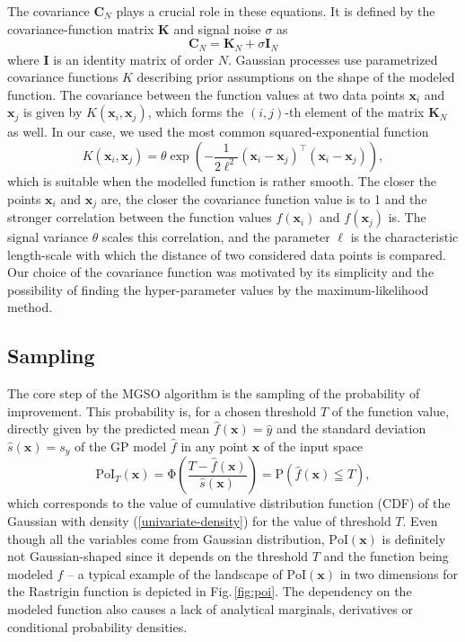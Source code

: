 \documentclass{itatnew}
\newcommand{\xx}{\mathrm{\mathbf{x}}}
\newcommand{\CC}{\mathrm{\mathbf{C}}}
\begin{document}
The covariance $\CC_N$ plays a crucial role in these equations. It is defined by the covariance-function matrix $\mathbf{K}$ and signal noise $\sigma$ as
\begin{equation}
  \CC_N = \mathbf{K}_N + \sigma \mathbf{I}_N
\end{equation}
where $\mathbf{I}$ is an identity matrix of order $N$. Gaussian processes use parametrized covariance functions $K$ describing prior assumptions on the shape of the modeled function. The covariance between the function values at two data points $\xx_i$ and $\xx_j$ is given by $K(\xx_i, \xx_j)$, which forms the $(i,j)$-th element of the matrix $\mathbf{K}_N$ as well. In our case, we used the most common squared-exponential function
\begin{equation}
K(\xx_i, \xx_j) = \theta \exp \left( -\frac{1}{2\ell^2} (\xx_i - \xx_j)^\top(\xx_i - \xx_j) \right), %
\end{equation}
which is suitable when the modelled function is rather smooth. The closer the points $\xx_i$ and $\xx_j$ are, the closer the covariance function value is to 1 and the stronger correlation between the function values $f(\xx_i)$ and $f(\xx_j)$ is. The signal variance $\theta$ scales this correlation,
and the parameter $\ell$ is the characteristic length-scale with which the distance of two considered data points is compared. Our choice of the covariance function was motivated by its simplicity and the possibility of finding the hyper-parameter values by the maximum-likelihood method. 


\subsection{Sampling}
\label{sec:sampling}

The core step of the MGSO algorithm is the sampling of the probability of improvement. This probability is, for a chosen threshold $T$ of the function value, directly given by the predicted mean $\hat{f}(\xx) = \hat{y}$ and the standard deviation $\hat{s}(\xx) = s_{y}$ of the GP model $\hat{f}$ in any point $\xx$ of the input space
\begin{equation}
  \mathrm{PoI}_T(\xx) = \mathrm{\Phi}\left( \frac{T - \hat{f}(\xx)}{\hat{s}(\xx)} \right) = \mathrm{P}(\hat{f}(\xx) \leqq T),
\end{equation}
which corresponds to the value of cumulative distribution function (CDF) of the Gaussian with density (\ref{univariate-density}) for the value of threshold $T$. Even though all the variables come from Gaussian distribution, $\mathrm{PoI}(\xx)$ is definitely not Gaussian-shaped since it depends on the threshold $T$ and the function being modeled $f$ -- a typical example of the landscape of $\textrm{PoI}(\xx)$ in two dimensions for the Rastrigin function is depicted in Fig.\,\ref{fig:poi}.
The dependency on the modeled function also causes a lack of analytical marginals, derivatives or conditional probability densities.
\end{document}
